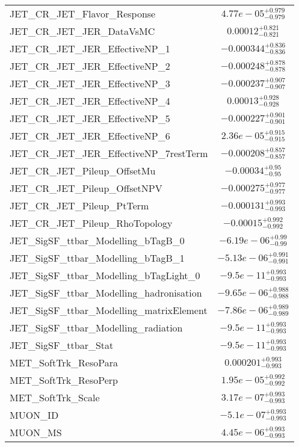 \begin{tabular}{|l|c|}
JET\_CR\_JET\_Flavor\_Response & $4.77e-05^{+0.979}_{-0.979}$ \\
JET\_CR\_JET\_JER\_DataVsMC & $0.00012^{+0.821}_{-0.821}$ \\
JET\_CR\_JET\_JER\_EffectiveNP\_1 & $-0.000344^{+0.836}_{-0.836}$ \\
JET\_CR\_JET\_JER\_EffectiveNP\_2 & $-0.000248^{+0.878}_{-0.878}$ \\
JET\_CR\_JET\_JER\_EffectiveNP\_3 & $-0.000237^{+0.907}_{-0.907}$ \\
JET\_CR\_JET\_JER\_EffectiveNP\_4 & $0.00013^{+0.928}_{-0.928}$ \\
JET\_CR\_JET\_JER\_EffectiveNP\_5 & $-0.000227^{+0.901}_{-0.901}$ \\
JET\_CR\_JET\_JER\_EffectiveNP\_6 & $2.36e-05^{+0.915}_{-0.915}$ \\
JET\_CR\_JET\_JER\_EffectiveNP\_7restTerm & $-0.000208^{+0.857}_{-0.857}$ \\
JET\_CR\_JET\_Pileup\_OffsetMu & $-0.00034^{+0.95}_{-0.95}$ \\
JET\_CR\_JET\_Pileup\_OffsetNPV & $-0.000275^{+0.977}_{-0.977}$ \\
JET\_CR\_JET\_Pileup\_PtTerm & $-0.000131^{+0.993}_{-0.993}$ \\
JET\_CR\_JET\_Pileup\_RhoTopology & $-0.00015^{+0.992}_{-0.992}$ \\
JET\_SigSF\_ttbar\_Modelling\_bTagB\_0 & $-6.19e-06^{+0.99}_{-0.99}$ \\
JET\_SigSF\_ttbar\_Modelling\_bTagB\_1 & $-5.13e-06^{+0.991}_{-0.991}$ \\
JET\_SigSF\_ttbar\_Modelling\_bTagLight\_0 & $-9.5e-11^{+0.993}_{-0.993}$ \\
JET\_SigSF\_ttbar\_Modelling\_hadronisation & $-9.65e-06^{+0.988}_{-0.988}$ \\
JET\_SigSF\_ttbar\_Modelling\_matrixElement & $-7.86e-06^{+0.989}_{-0.989}$ \\
JET\_SigSF\_ttbar\_Modelling\_radiation & $-9.5e-11^{+0.993}_{-0.993}$ \\
JET\_SigSF\_ttbar\_Stat & $-9.5e-11^{+0.993}_{-0.993}$ \\
MET\_SoftTrk\_ResoPara & $0.000201^{+0.993}_{-0.993}$ \\
MET\_SoftTrk\_ResoPerp & $1.95e-05^{+0.992}_{-0.992}$ \\
MET\_SoftTrk\_Scale & $3.17e-07^{+0.993}_{-0.993}$ \\
MUON\_ID & $-5.1e-07^{+0.993}_{-0.993}$ \\
MUON\_MS & $4.45e-06^{+0.993}_{-0.993}$ \\

\end{tabular}
